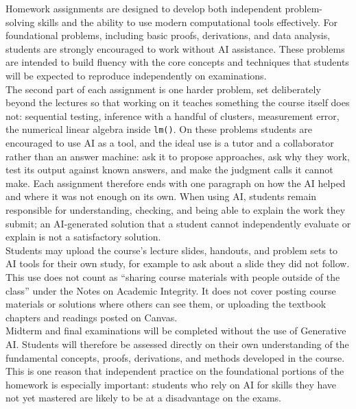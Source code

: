 \documentclass[PS]{syllabus}
\newif\ifrelease
\begin{document}
\begin{syllabus}
Homework assignments are designed to develop both independent problem-solving skills and the ability to use modern computational tools effectively. For foundational problems, including basic proofs, derivations, and data analysis, students are strongly encouraged to work without AI assistance. These problems are intended to build fluency with the core concepts and techniques that students will be expected to reproduce independently on examinations.\\

The second part of each assignment is one harder problem, set deliberately beyond the lectures so that working on it teaches something the course itself does not: sequential testing, inference with a handful of clusters, measurement error, the numerical linear algebra inside {\tt lm()}. On these problems students are encouraged to use AI as a tool, and the ideal use is a tutor and a collaborator rather than an answer machine: ask it to propose approaches, ask why they work, test its output against known answers, and make the judgment calls it cannot make. Each assignment therefore ends with one paragraph on how the AI helped and where it was not enough on its own. When using AI, students remain responsible for understanding, checking, and being able to explain the work they submit; an AI-generated solution that a student cannot independently evaluate or explain is not a satisfactory solution.\\

Students may upload the course's lecture slides, handouts, and problem sets to AI tools for their own study, for example to ask about a slide they did not follow. This use does not count as ``sharing course materials with people outside of the class'' under the Notes on Academic Integrity. It does not cover posting course materials or solutions where others can see them, or uploading the textbook chapters and readings \ifrelease provided in the course\else posted on Canvas\fi.\\

Midterm and final examinations will be completed without the use of Generative AI. Students will therefore be assessed directly on their own understanding of the fundamental concepts, proofs, derivations, and methods developed in the course. This is one reason that independent practice on the foundational portions of the homework is especially important: students who rely on AI for skills they have not yet mastered are likely to be at a disadvantage on the exams.



\end{syllabus}
\end{document}
